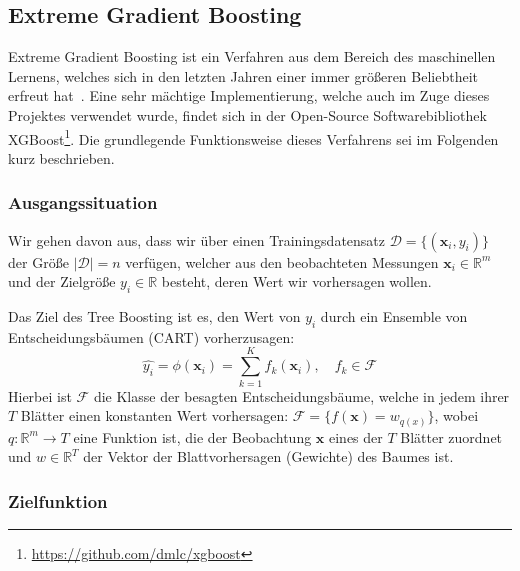 \subsection{Extreme Gradient Boosting}
\label{sec:xgboost}

Extreme Gradient Boosting ist ein Verfahren aus dem Bereich des maschinellen Lernens, welches sich
in den letzten Jahren einer immer gr\"o{\ss}eren Beliebtheit erfreut hat~\cite{XGBoost}.
Eine sehr m\"achtige Implementierung, welche auch im Zuge dieses Projektes verwendet wurde, 
findet sich in der Open-Source Softwarebibliothek XGBoost\footnote{\url{https://github.com/dmlc/xgboost}}.
Die grundlegende Funktionsweise dieses Verfahrens sei im Folgenden kurz beschrieben.

\subsubsection{Ausgangssituation}

Wir gehen davon aus, dass wir \"uber einen Trainingsdatensatz $\mathcal{D} = \{(\mathbf{x}_i, y_i)\}$
der Gr\"o{\ss}e $\left| \mathcal{D} \right| = n$ verf\"ugen, welcher aus den beobachteten Messungen $\mathbf{x}_i \in \mathbb{R}^m$
und der Zielgr\"o{\ss}e $y_i \in \mathbb{R}$ besteht, deren Wert wir vorhersagen wollen.

Das Ziel des Tree Boosting ist es, den Wert von $y_i$ durch ein Ensemble von Entscheidungsb\"aumen (CART)
vorherzusagen:
\begin{equation}
    \hat{y_i} = \phi(\mathbf{x}_i) =  \sum_{k=1}^K f_k(\mathbf{x}_i), \quad f_k \in \mathcal{F}
\end{equation}
Hierbei ist $\mathcal{F}$ die Klasse der besagten Entscheidungsb\"aume, welche in jedem ihrer $T$ Bl\"atter
einen konstanten Wert vorhersagen: $\mathcal{F} = \{f(\mathbf{x}) = w_{q(x)}\}$, wobei $q: \mathbb{R}^m \rightarrow T$
eine Funktion ist, die der Beobachtung $\mathbf{x}$ eines der $T$ Bl\"atter zuordnet und $w \in \mathbb{R}^T$ der Vektor
der Blattvorhersagen (Gewichte) des Baumes ist.

\subsubsection{Zielfunktion}

